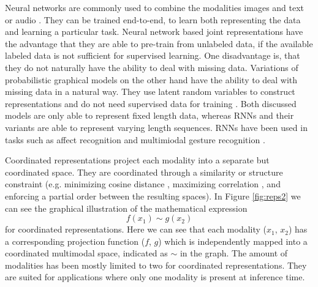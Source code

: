\documentclass{article}
\begin{document}
Neural networks are commonly used to combine the modalities images and text \citep{silberer2014learning} or audio \citep{mroueh2015deep, ngiam2011multimodal, wu2014exploring}. They can be trained end-to-end, to learn both representing the data and learning a particular task. Neural network based joint representations have the advantage that they are able to pre-train from unlabeled data, if the available labeled data is not sufficient for supervised learning. One disadvantage is, that they do not naturally have the ability to deal with missing data. Variations of probabilistic graphical models on the other hand have the ability to deal with missing data in a natural way. They use latent random variables to construct representations \citep{bengio2013represent} and do not need supervised data for training \citep{salakhutdinov2009boltz}. Both discussed models are only able to represent fixed length data, whereas RNNs and their variants are able to represent varying length sequences. RNNs have been used in tasks such as affect recognition \citep{chen2015multi, nicolaou2011contin} and multimiodal gesture recognition \citep{rajagopalan2016extend}.

Coordinated representations project each modality into a separate but coordinated space. They are coordinated through a similarity or structure constraint (e.g. minimizing cosine distance \citep{frome2013devise}, maximizing correlation \citep{andrew2013deep}, and enforcing a partial order \citep{vendrov2016order} between the resulting spaces). In Figure \ref{fig:reps2} we can see the graphical illustration of the mathematical expression
\begin{equation}
f(x_1) \sim g(x_2)
\end{equation}
for coordinated representations. Here we can see that each modality ($x_1$, $x_2$) has a corresponding projection function ($f$, $g$) which is independently mapped into a coordinated multimodal space, indicated as $\sim$ in the graph. The amount of modalities has been mostly limited to two for coordinated representations. They are suited for applications where only one modality is present at inference time.
\end{document}
